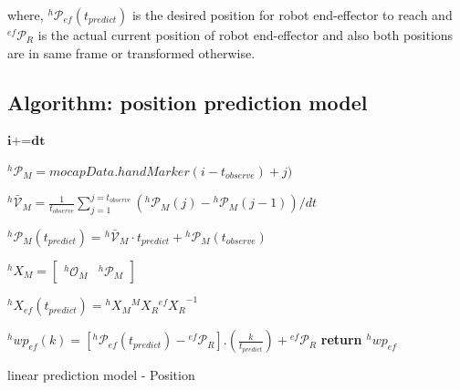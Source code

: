 where, ${}^{h}\mathcal{P}_{ef}(t_{predict})$ is the desired position for robot end-effector to reach and ${}^{ef}\mathcal{P}_{R}$ is the actual current position of robot end-effector and also both positions are in same frame or transformed otherwise.

\subsection{Algorithm: position prediction model}

\begin{algorithm}[H] \label{positionalgo}
	\DontPrintSemicolon
	\SetNoFillComment
	
	
	
	\textit{$\textbf{i+=dt}$} 
	
	{
		{
			${}^{h}\mathcal{P}_M= \textit{mocapData}.handMarker(i-t_{observe})+j)$	
		}
		
		${}^{h}\mathcal{\bar{V}}_{M} = \frac{1}{t_{observe}}{\sum_{j=1}^{j=t_{observe}} ({}^{h}\mathcal{P}_{M}(j)-{}^{h}\mathcal{P}_{M}(j-1))/dt }$\newline 
		
		${}^{h}\mathcal{P}_M(t_{predict}) = {}^{h}\mathcal{\bar{V}}_{M} \cdot t_{predict}  + {}^{h}\mathcal{P}_{M}(t_{observe})$ %
		
		
		${}^{h}{X}_M= \begin{bmatrix} {}^{h}\mathcal{O}_{M} &  {}^{h}\mathcal{P}_M	\end{bmatrix}$ \newline
		
		${}^{h}{X}_{ef}(t_{predict}) =  {}^{h}{X}_M  {}^{M}{X}_R {{}^{ef}{X}_R}^{-1}$ \newline
		
		
		{
			{
				${}^{h}wp_{ef}(k) = [{}^{h}\mathcal{P}_{ef}(t_{predict}) - {}^{ef}\mathcal{P}_{R}] . (\frac{k}{t_{predict}})  + {}^{ef}\mathcal{P}_{R} $ 
			}	
			\textbf{return} $ {}^{h}wp_{ef} $
		}
	}
	\caption{linear prediction model - Position}
\end{algorithm}



